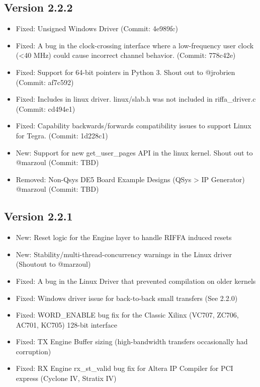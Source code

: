 \documentclass{refrep}
\begin{document}
\subsection{Version 2.2.2}
\begin{itemize}
\item Fixed: Unsigned Windows Driver (Commit: 4e989fc)

\item Fixed: A bug in the clock-crossing interface where a low-frequency user
  clock (<40 MHz) could cause incorrect channel behavior. (Commit: 778c42e)

\item Fixed: Support for 64-bit pointers in Python 3. Shout out to 
  @jrobrien (Commit: af7c592)

\item Fixed: Includes in linux driver. linux/slab.h was not included in 
  riffa\_driver.c (Commit: cd494e1)

\item Fixed: Capability backwards/forwards compatibility issues to support Linux
  for Tegra. (Commit: 1d228c1)

\item New: Support for new get\_user\_pages API in the linux kernel. Shout out to
  @marzoul (Commit: TBD)

\item Removed: Non-Qsys DE5 Board Example Designs (QSys > IP Generator)
  @marzoul (Commit: TBD)

\end{itemize}
\subsection{Version 2.2.1}
\begin{itemize}
\item New: Reset logic for the Engine layer to handle RIFFA induced resets

\item New: Stability/multi-thread-concurrency warnings in the Linux driver 
  (Shoutout to @marzoul)

\item Fixed: A bug in the Linux Driver that prevented compilation on older kernels

\item Fixed: Windows driver issue for back-to-back small transfers (See 2.2.0)

\item Fixed: WORD\_ENABLE bug fix for the Classic Xilinx (VC707, ZC706, AC701, 
  KC705) 128-bit interface

\item Fixed: TX Engine Buffer sizing (high-bandwidth transfers occasionally had 
  corruption)

\item Fixed: RX Engine rx\_st\_valid bug fix for Altera IP Compiler for PCI express 
  (Cyclone IV, Stratix IV)
\end{itemize}
\end{document}
